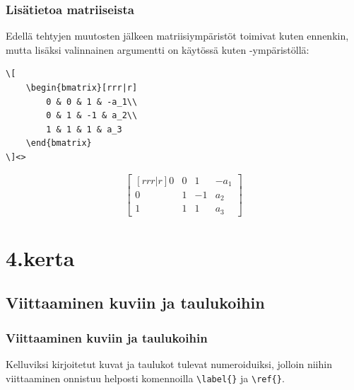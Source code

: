 \begin{frame}[fragile]
    \frametitle{Lisätietoa matriiseista}
    Edellä tehtyjen muutosten jälkeen matriisiympäristöt toimivat kuten ennenkin, mutta lisäksi valinnainen argumentti on käytössä kuten -ympäristöllä:
    \vaihto
    \begin{minipage}{6cm}
        \begin{lstlisting}
\[
    \begin{bmatrix}[rrr|r]
        0 & 0 & 1 & -a_1\\
        0 & 1 & -1 & a_2\\
        1 & 1 & 1 & a_3
    \end{bmatrix}
\]<>
        \end{lstlisting}
    \end{minipage}
    \begin{minipage}{4cm}
        \[
            \begin{bmatrix}[rrr|r]
                0 & 0 & 1 & -a_1\\
                0 & 1 & -1 & a_2\\
                1 & 1 & 1 & a_3
            \end{bmatrix}
        \]
    \end{minipage}
\end{frame}



\section{4.kerta}


\subsection{Viittaaminen kuviin ja taulukoihin}

\begin{frame}[fragile]
    \frametitle{Viittaaminen kuviin ja taulukoihin}
    Kelluviksi kirjoitetut kuvat ja taulukot tulevat numeroiduiksi, jolloin niihin viittaaminen onnistuu helposti komennoilla \lstinline-\label{}- ja \lstinline-\ref{}-. 
    
    
\end{frame}


